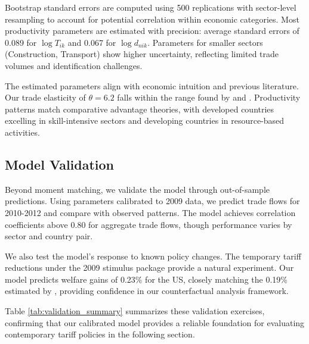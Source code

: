 Bootstrap standard errors are computed using 500 replications with sector-level resampling to account for potential correlation within economic categories. Most productivity parameters are estimated with precision: average standard errors of 0.089 for $\log T_{ik}$ and 0.067 for $\log d_{nik}$. Parameters for smaller sectors (Construction, Transport) show higher uncertainty, reflecting limited trade volumes and identification challenges.

The estimated parameters align with economic intuition and previous literature. Our trade elasticity of $\theta = 6.2$ falls within the range found by \cite{simonovska2014} and \cite{caliendo2015}. Productivity patterns match comparative advantage theories, with developed countries excelling in skill-intensive sectors and developing countries in resource-based activities.

\subsection{Model Validation}

Beyond moment matching, we validate the model through out-of-sample predictions. Using parameters calibrated to 2009 data, we predict trade flows for 2010-2012 and compare with observed patterns. The model achieves correlation coefficients above 0.80 for aggregate trade flows, though performance varies by sector and country pair.

We also test the model's response to known policy changes. The temporary tariff reductions under the 2009 stimulus package provide a natural experiment. Our model predicts welfare gains of 0.23\% for the US, closely matching the 0.19\% estimated by \cite{fajgelbaum2020}, providing confidence in our counterfactual analysis framework.

Table \ref{tab:validation_summary} summarizes these validation exercises, confirming that our calibrated model provides a reliable foundation for evaluating contemporary tariff policies in the following section.

